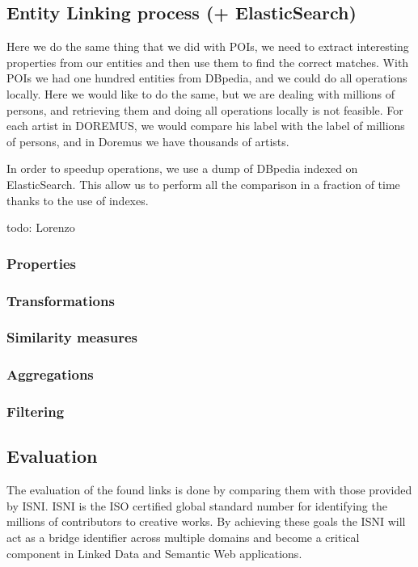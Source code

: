\documentclass[paper=a4, fontsize=11pt]{scrartcl}
\begin{document}
\subsection{Entity Linking process (+ ElasticSearch)}
Here we do the same thing that we did with POIs, we need to extract interesting properties from our entities and then use them to find the correct matches. 
With POIs we had one hundred entities from DBpedia, and we could do all operations locally. Here we would like to do the same, but we are dealing with millions of persons, and retrieving them and doing all operations locally is not feasible. For each artist in DOREMUS, we would compare his label with the label of millions of persons, and in Doremus we have thousands of artists.

In order to speedup operations, we use a dump of DBpedia indexed on ElasticSearch. This allow us to perform all the comparison in a fraction of time thanks to the use of indexes.

todo: Lorenzo


\subsubsection{Properties}
\subsubsection{Transformations}
\subsubsection{Similarity measures}
\subsubsection{Aggregations}
\subsubsection{Filtering}
\subsection{Evaluation}
The evaluation of the found links is done by comparing them with those provided by ISNI. ISNI is the ISO certified global standard number for identifying the millions of contributors to creative works. By achieving these goals the ISNI will act as a bridge identifier across multiple domains and become a critical component in Linked Data and Semantic Web applications.
\end{document}
